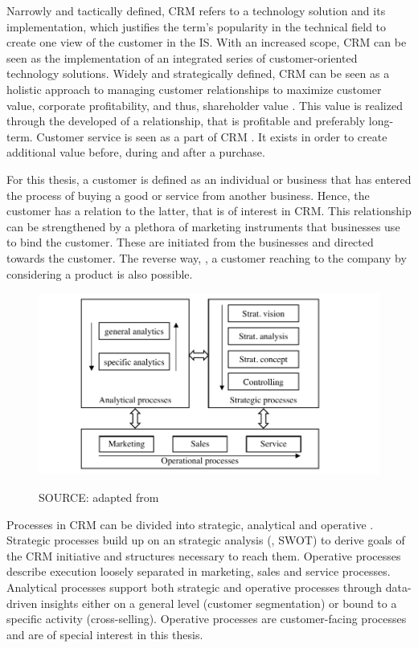 		Narrowly and tactically defined, \acrshort{CRM} refers to a technology solution and its implementation, which justifies the term's popularity in the technical field to create one view of the customer in the \acrshort{IS}. With an increased scope, \acrshort{CRM} can be seen as the implementation of an integrated series of customer-oriented technology solutions. Widely and strategically defined, \acrshort{CRM} can be seen as a holistic approach to managing customer relationships to maximize customer value, corporate profitability, and thus, shareholder value \citep{payne2004role}. This value is realized through the developed of a relationship, that is profitable and preferably long-term.  Customer service is seen as a part of \acrshort{CRM} \citep[]{Helmke_2012}. It exists in order to create additional value before, during and after a purchase. 
	
		For this thesis, a customer is defined as an individual or business that has entered the process of buying a good or service from another business. Hence, the customer has a relation to the latter, that is of interest in CRM. This relationship can be strengthened by a plethora of marketing instruments that businesses use to bind the customer. These are initiated from the businesses and directed towards the customer. The reverse way, \ie, a customer reaching to the company by considering a product is also possible. 
		
			\begin{figure}[caption={CRM processes}, label={fig:crmprocessfr}]
			{	\includegraphics[width=.8\textwidth]{figures/crmprocessfr.pdf}
				
		\hspace{5.9cm}	SOURCE: adapted from \citep[]{Helmke_2012}
				
			 }
		\end{figure}
		
		Processes in CRM can be divided into strategic, analytical and operative \citep{Neckel2005}. Strategic processes build up on an strategic analysis (\ie, SWOT) to derive goals of the CRM initiative and structures necessary to reach them. Operative processes describe execution loosely separated in marketing, sales and service processes. Analytical processes support both strategic and operative processes through data-driven insights either on a general level (\ie customer segmentation) or bound to a specific activity (\ie cross-selling). Operative processes are customer-facing processes and are of special interest in this thesis. 
		
